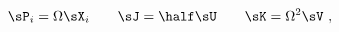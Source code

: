 \begin{equation*}
  \sP_i = \Omega \sX_i \qquad \sJ = \half \sU  \qquad \sK = \Omega^2
  \sV~,
\end{equation*}


